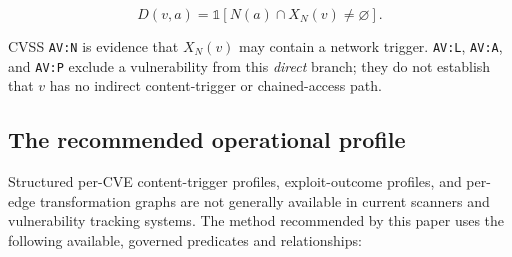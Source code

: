 \documentclass[11pt]{article}
\newcommand{\code}[1]{\texttt{#1}}
\newcommand{\ind}{\mathds{1}}
\begin{document}
\begin{equation}
D(v,a)=\ind\!\left[N(a)\cap X_N(v)\neq\varnothing\right].
\label{eq:direct}
\end{equation}

CVSS \code{AV:N} is evidence that $X_N(v)$ may contain a network trigger.
\code{AV:L}, \code{AV:A}, and \code{AV:P} exclude a vulnerability from this
\emph{direct} branch; they do not establish that $v$ has no indirect
content-trigger or chained-access path.

\subsection{The recommended operational profile}
Structured per-CVE content-trigger profiles, exploit-outcome profiles, and
per-edge transformation graphs are not generally available in current scanners
and vulnerability tracking systems. The method recommended by this paper uses
the following available, governed predicates and relationships:
\end{document}
